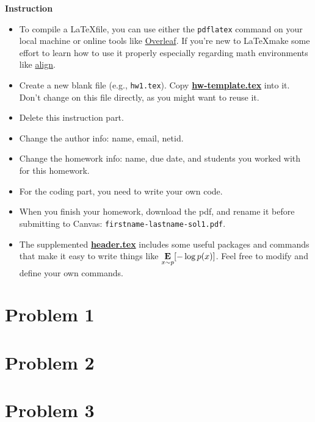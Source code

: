 \documentclass[12pt]{article}
\author{\myinfo{Your Name}{Your NetID}{Your Email}}
\title{\homeworkinfo{1}{September 23, 2021}{Collaborators}}
\date{}
\begin{document}
\maketitle
{}
\thispagestyle{fancy}




\textbf{Instruction}
\begin{itemize}
\item To compile a \LaTeX file, you can use either the \texttt{pdflatex} command on your local machine or online tools like
  \href{https://www.overleaf.com/learn/latex/Learn_LaTeX_in_30_minutes}{Overleaf}.
  If you're new to \LaTeX make some effort to learn how to use it properly especially regarding math environments like \href{https://www.overleaf.com/learn/latex/Aligning_equations_with_amsmath}{align}.
\item Create a new blank file (e.g., \texttt{hw1.tex}). Copy \ul{\textbf{hw-template.tex}} into it. Don't change on this file directly, as you might want to reuse it.
\item Delete this instruction part.
\item Change the author info: name, email, netid.
\item Change the homework info: name, due date, and students you worked with for this homework.
\item For the coding part, you need to write your own code.
\item When you finish your homework, download the pdf, and rename it before submitting to Canvas: \texttt{firstname-lastname-sol1.pdf}.
\item The supplemented \ul{\textbf{header.tex}} includes some useful packages and commands that make it easy to write things
  like $\expected{x \sim p}{-\log p(x)}$. Feel free to modify and define your own commands.
\end{itemize}


\section*{Problem 1}


\section*{Problem 2}


\section*{Problem 3}


\end{document}
